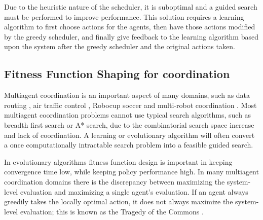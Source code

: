 \documentclass{sig-alternate}
\begin{document}
Due to the heuristic nature of the scheduler, it is suboptimal and a guided search must be performed to improve performance. This solution requires a learning algorithm to first choose actions for the agents, then have those actions modified by the greedy scheduler, and finally give feedback to the learning algorithm based upon the system after the greedy scheduler and the original actions taken.


\subsection{Fitness Function Shaping for coordination}
Multiagent coordination is an important aspect of many domains, such as data routing \cite{tumer-wolpert_jair02}, air traffic control \cite{tumer-agogino_jaamas12, Sislak:2008:AMA:1402744.1402755}, Robocup soccer \cite{AAMAS12-agmon} and multi-robot coordination \cite{5509316}. Most multiagent coordination problems cannot use typical search algorithms, such as breadth first search or A* search, due to the combinatorial search space increase and lack of coordination. A learning or evolutionary algorithm will often convert a once computationally intractable search problem into a feasible guided search. 

In evolutionary algorithms fitness function design is important in keeping convergence time low, while keeping policy performance high. In many multiagent coordination domains there is the discrepancy between maximizing the system-level evaluation and maximizing a single agent's evaluation. If an agent always greedily takes the locally optimal action, it does not always maximize the system-level evaluation; this is known as the Tragedy of the Commons \cite{Hardin}.
\end{document}

